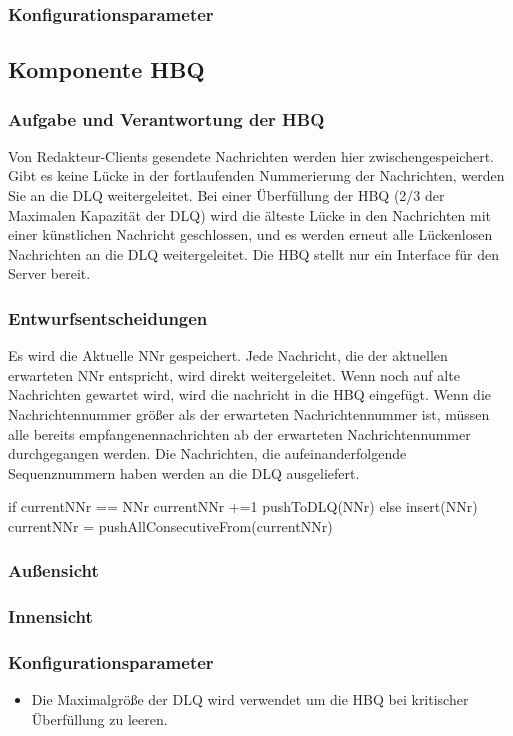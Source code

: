 \documentclass{article}
\begin{document}
\subsubsection{Konfigurationsparameter}
			
\subsection{Komponente HBQ}
\subsubsection{Aufgabe und Verantwortung der HBQ}
Von Redakteur-Clients gesendete Nachrichten werden hier zwischengespeichert. Gibt es keine Lücke in der fortlaufenden Nummerierung der Nachrichten, werden Sie an die DLQ weitergeleitet. Bei einer Überfüllung der HBQ (2/3 der Maximalen Kapazität der DLQ) wird die älteste Lücke in den Nachrichten mit einer künstlichen Nachricht geschlossen, und es werden erneut alle Lückenlosen Nachrichten an die DLQ weitergeleitet. Die HBQ stellt nur ein Interface für den Server bereit.

\subsubsection{Entwurfsentscheidungen}
Es wird die Aktuelle NNr gespeichert.
Jede Nachricht, die der aktuellen erwarteten NNr entspricht, wird direkt weitergeleitet.
Wenn noch auf alte Nachrichten gewartet wird, wird die nachricht in die HBQ eingefügt.
Wenn die Nachrichtennummer größer als der erwarteten Nachrichtennummer ist,
müssen alle bereits empfangenennachrichten ab der erwarteten Nachrichtennummer durchgegangen werden.
Die Nachrichten, die aufeinanderfolgende Sequenznummern haben werden an die
DLQ ausgeliefert.
				
if currentNNr == NNr
	currentNNr +=1
	pushToDLQ(NNr)
else
	insert(NNr)
	currentNNr = pushAllConsecutiveFrom(currentNNr) 
				
\subsubsection{Außensicht}

\subsubsection{Innensicht}

\subsubsection{Konfigurationsparameter}
\begin{itemize}
	\item Die Maximalgröße der DLQ wird verwendet um die HBQ bei kritischer Überfüllung zu leeren.
\end{itemize}
\newpage
\end{document}
